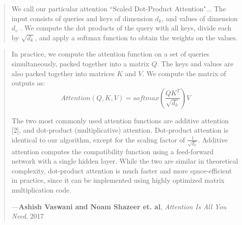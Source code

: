 \documentclass[a4paper, 18pt]{book} %
\begin{document}
\begin{appendices}
\noindent
\begin{minipage}{1\textwidth}
\vspace{1em}
\begin{quotation}
{\ttfamily

We call our particular attention ``Scaled Dot-Product Attention"... The input consists of
queries and keys of dimension $d_k$, and values of dimension $d_v$ . We compute the dot products of the query with all keys, divide each by $\sqrt{d_k}$, and apply a softmax function to obtain the weights on the values.\\

}
\end{quotation}
\vspace{1em}
\end{minipage}

\vspace{2em}


\noindent
\begin{minipage}{1\textwidth}
\vspace{1em}
\begin{quotation}
{\ttfamily


In practice, we compute the attention function on a set of queries simultaneously, packed together
into a matrix $Q$. The keys and values are also packed together into matrices $K$ and $V$. We compute the matrix of outputs as:\\


\begin{equation}
Attention(Q, K, V ) = softmax( \frac{QK^T}{\sqrt{d_k}})V
\end{equation}

\vspace{2em}

The two most commonly used attention functions are additive attention [2], and dot-product (multiplicative) attention. Dot-product attention is identical to our algorithm, except for the scaling factor of $\frac{1}{\sqrt{d_k}}$. Additive attention computes the compatibility function using a feed-forward network with a single hidden layer. While the two are similar in theoretical complexity, dot-product attention is much faster and more space-efficient in practice, since it can be implemented using highly optimized matrix multiplication code.

}
\hspace*{\fill} ---\textbf{Ashish Vaswani and Noam Shazeer et. al}, \textit{Attention Is All You Need}, 2017\cite{Vaswani2017}
\end{quotation}
\vspace{1em}
\end{minipage}



\end{appendices}
\end{document}
